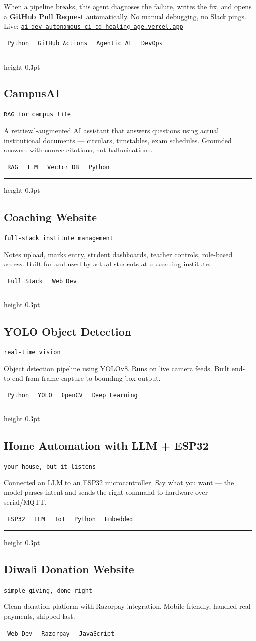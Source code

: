 \documentclass[10pt, a4paper]{article}
\newcommand{\cvtag}[1]{%
  \colorbox{tagbg}{%
    \texttt{\relsize{-2}\color{mid}\,#1\,}%
  }\hspace{1.5pt}%
}
\newcommand{\projhead}[2]{%
  \subsection*{#1}%
  \vspace{-3pt}%
  {\texttt{\relsize{-2}\color{faint}#2}}%
  \vspace{3pt}%
}
\newcommand{\pdiv}{%
  \vspace{4pt}%
  {\color{rule}\hrule height 0.3pt}%
  \vspace{8pt}%
}
\begin{document}
When a pipeline breaks, this agent diagnoses the failure, writes the fix, and opens a \textbf{GitHub Pull Request} automatically. No manual debugging, no Slack pings.
Live: \href{https://ai-dev-autonomous-ci-cd-healing-age.vercel.app/}{\texttt{ai-dev-autonomous-ci-cd-healing-age.vercel.app}}

\smallskip
\cvtag{Python} \cvtag{GitHub Actions} \cvtag{Agentic AI} \cvtag{DevOps}

\pdiv

\projhead{CampusAI}{RAG for campus life}

A retrieval-augmented AI assistant that answers questions using actual institutional documents --- circulars, timetables, exam schedules. Grounded answers with source citations, not hallucinations.

\smallskip
\cvtag{RAG} \cvtag{LLM} \cvtag{Vector DB} \cvtag{Python}

\pdiv

\projhead{Coaching Website}{full-stack institute management}

Notes upload, marks entry, student dashboards, teacher controls, role-based access. Built for and used by actual students at a coaching institute.

\smallskip
\cvtag{Full Stack} \cvtag{Web Dev}

\pdiv

\projhead{YOLO Object Detection}{real-time vision}

Object detection pipeline using YOLOv8. Runs on live camera feeds. Built end-to-end from frame capture to bounding box output.

\smallskip
\cvtag{Python} \cvtag{YOLO} \cvtag{OpenCV} \cvtag{Deep Learning}

\pdiv

\projhead{Home Automation with LLM + ESP32}{your house, but it listens}

Connected an LLM to an ESP32 microcontroller. Say what you want --- the model parses intent and sends the right command to hardware over serial/MQTT.

\smallskip
\cvtag{ESP32} \cvtag{LLM} \cvtag{IoT} \cvtag{Python} \cvtag{Embedded}

\pdiv

\projhead{Diwali Donation Website}{simple giving, done right}

Clean donation platform with Razorpay integration. Mobile-friendly, handled real payments, shipped fast.

\smallskip
\cvtag{Web Dev} \cvtag{Razorpay} \cvtag{JavaScript}
\end{document}
